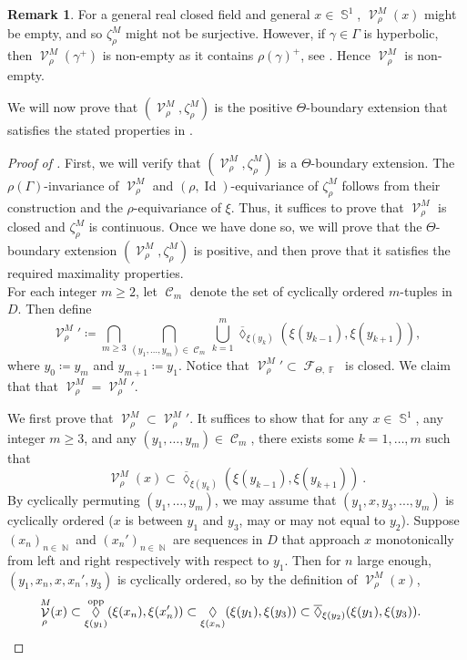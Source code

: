 \documentclass{amsart}
\theoremstyle{plain}
\theoremstyle{definition}
\newtheorem{remark}[proposition]{Remark}
\DeclareMathOperator{\Id}{Id}
\DeclareMathOperator{\Diam}{\lozenge}
\newcommand{\bdext}{{\Vc^M_\rho}}
\DeclareMathOperator{\Cc}{\mathcal{C}}
\DeclareMathOperator{\Fc}{\mathcal{F}}
\DeclareMathOperator{\Vc}{\mathcal{V}}
\DeclareMathOperator{\Fb}{{\mathbb{F}}}
\DeclareMathOperator{\Nb}{{\mathbb{N}}}
\DeclareMathOperator{\Sb}{\mathbb{S}}
\newcommand{\opp}{\textnormal{opp}}
\newcommand{\1}{\mathbf{1}}
\begin{document}
\begin{remark}\label{non-surjectivity}
For a general real closed field and general $x\in\Sb^1$, $\bdext(x)$ might be empty, and so $\zeta^M_\rho$ might not be surjective.
However, if $\gamma\in\Gamma$ is hyperbolic, then $\bdext(\gamma^+)$ is non-empty as it contains $\rho(\gamma)^+$, see . Hence $\bdext$ is non-empty.
\end{remark}

We will now prove that $(\bdext , \zeta^M_\rho)$ is the positive $\Theta$-boundary extension that satisfies the stated properties in .

\begin{proof}[Proof of ]
First, we will verify that $(\bdext , \zeta^M_\rho)$ is a $\Theta$-boundary extension.
The $\rho(\Gamma)$-invariance of $\bdext $ and $(\rho,\Id)$-equivariance of $\zeta^M_\rho$ follows from their construction and the $\rho$-equivariance of $\xi$. Thus, it suffices to prove that $\bdext $ is closed and $\zeta^M_\rho$ is continuous. Once we have done so, we will prove that the $\Theta$-boundary extension $(\bdext , \zeta^M_\rho)$ is positive, and then prove that it satisfies the required maximality properties.\\
        
    \noindent {\bf Closedness of $\bdext $.} For each integer $m\ge 2$, let $\Cc_m$ denote the set of cyclically ordered $m$-tuples in $D$.
    Then define
     \[\bdext'\coloneqq \bigcap_{m\ge 3}\bigcap_{(y_1,...,y_m) \in \Cc_m} \bigcup_{k=1}^m  \overline{\Diam}_{\xi(y_k)}(\xi(y_{k-1}),\xi(y_{k+1})),\]
     where $y_0\coloneqq y_m$ and $y_{m+1}\coloneqq y_1$.
     Notice that $\bdext'\subset\Fc_{\Theta,\Fb}$ is closed. We claim that that $\bdext = \bdext'$.

    We first prove that $\bdext \subset \bdext'$. It suffices to show that for any $x\in\Sb^1$, any integer $m\ge 3$, and any $(y_1,\dots,y_m)\in\Cc_m$, there exists some $k=1,\dots,m$ such that
    \[\bdext(x)\subset\overline{\Diam}_{\xi(y_{k})}(\xi(y_{k-1}),\xi(y_{k+1}))~.\]
    By cyclically permuting $(y_1,\dots,y_m)$, we may assume that $(y_1,x,y_3,...,y_m)$ is cyclically ordered ($x$ is between $y_1$ and $y_3$, may or may not equal to $y_2$). Suppose $(x_n)_{n\in\Nb}$ and $(x_n')_{n\in\Nb}$ are sequences in $D$ that approach $x$ monotonically from left and right respectively with respect to $y_1$. Then for $n$ large enough, $(y_1, x_n, x, x_n',y_3)$ is cyclically ordered, so by the definition of $\Vc_\rho^M(x)$,
    \begin{align*}
     \Vc_\rho^M(x)&\subset \Diam_{\xi(y_1)}^\opp(\xi(x_n),\xi(x_n')) \subset \Diam_{\xi(x_n)}(\xi(y_1),\xi(y_3))\subset \overline{\Diam}_{\xi(y_2)}(\xi(y_1),\xi(y_3)).
    \end{align*}


\end{proof}
\end{document}
